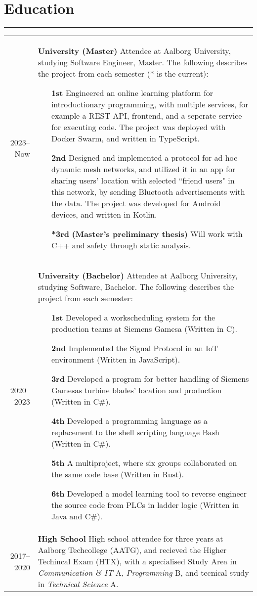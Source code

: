 \documentclass[a4paper]{report}
\def\secsep{\hrule width5cm}
\begin{document}
\newcommand{\p}[1]{\textbf{#1}\mbox{}\newline}
\def\n{\\\\}
\section*{Education}
\secsep
\begin{longtabu} to \textwidth {r|X}
    2023--Now & \p{University (Master)}
    Attendee at Aalborg University, studying Software Engineer, Master. The following describes the project from each semester (* is the current):
    \begin{itemize}[leftmargin=4em]
        \item[\textbf{1st}] Engineered an online learning platform for introductionary programming, with multiple services, for example a REST API, frontend, and a seperate service for executing code. The project was deployed with Docker Swarm, and written in TypeScript.
        \item[\textbf{2nd}] Designed and implemented a protocol for ad-hoc dynamic mesh networks, and utilized it in an app for sharing users' location with selected ``friend users" in this network, by sending Bluetooth advertisements with the data. The project was developed for Android devices, and written in Kotlin.
        \item[\textbf{*3rd}] \textbf{(Master's preliminary thesis)} Will work with C++ and safety through static analysis.
    \end{itemize}
    \\
    2020--2023 & \p{University (Bachelor)}
    Attendee at Aalborg University, studying Software, Bachelor. The following describes the project from each semester:
    \begin{itemize}[leftmargin=4em]
        \item[\textbf{1st}] Developed a workscheduling system for the production teams at Siemens Gamesa (Written in C).
        \item[\textbf{2nd}] Implemented the Signal Protocol in an IoT environment (Written in JavaScript).
        \item[\textbf{3rd}] Developed a program for better handling of Siemens Gamesas turbine blades' location and production (Written in C\#).
        \item[\textbf{4th}] Developed a programming language as a replacement to the shell scripting language Bash (Written in C\#).
        \item[\textbf{5th}] A multiproject, where six groups collaborated on the same code base (Written in Rust).
        \item[\textbf{6th}] Developed a model learning tool to reverse engineer the source code from PLCs in ladder logic (Written in Java and C\#).
    \end{itemize}
    \\
    2017--2020 & \p{High School} 
    High school attendee for three years at Aalborg Techcollege (AATG), and recieved the Higher
    Techincal Exam (HTX), with a specialised Study Area in \textit{Communication \& IT} A,
    \textit{Programming} B, and tecnical study in \textit{Technical Science} A.
\end{longtabu}
\end{document}
